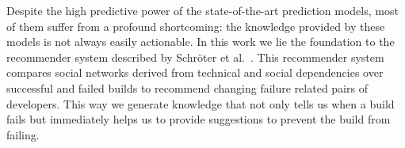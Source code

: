 Despite the high predictive power of the state-of-the-art prediction models, most
of them suffer from a profound shortcoming: the knowledge provided by these
models is not always easily actionable. In this work we lie the foundation to
the recommender system described by Schr\"oter et
al.~\cite{schroeter:rsse:2008}. 
%
This recommender system compares social networks derived from technical and social dependencies over successful and failed builds to recommend changing failure related pairs of developers.
%
%
This way we generate knowledge that not only tells us when a build fails but immediately helps us to provide suggestions to prevent the build from failing.

